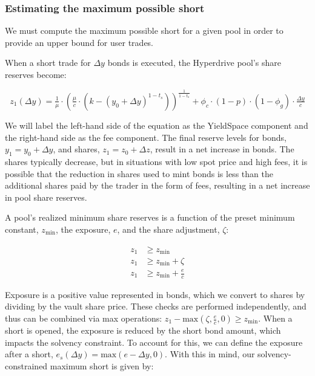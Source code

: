 \subsubsection{Estimating the maximum possible short}

We must compute the maximum possible short for a given pool in order to provide an upper bound for user trades.

When a short trade for $\Delta y$ bonds is executed, the Hyperdrive pool's share reserves become:

\begin{equation}\label{reserve-after-max}
    z_1(\Delta y) = \tfrac{1}{\mu}
    \cdot \left( \tfrac{\mu}{c} \cdot \left( k - (y_0 + \Delta y)^{1 - t_s} \right) \right)^{\tfrac{1}{1 - t_s}}
    + \phi_c \cdot (1 - p) \cdot (1 - \phi_g) \cdot \tfrac{\Delta y}{c}
\end{equation}

We will label the left-hand side of the equation as the YieldSpace component and the right-hand side as the fee component.
The final reserve levels for bonds, $y_1 = y_0 + \Delta y$, and shares, $z_1 = z_0 + \Delta z$, result in a net increase in bonds.
The shares typically decrease, but in situations with low spot price and high fees, it is possible that the reduction in shares used to mint bonds is less than the additional shares paid by the trader in the form of fees, resulting in a net increase in pool share reserves.


A pool's realized minimum share reserves is a function of the preset minimum constant, $z_{\text{min}}$, the exposure, $e$, and the share adjustment, $\zeta$:

\begin{equation}\label{solvency-constraints}
\begin{aligned}
    z_1 &\ge z_{\text{min}} \\
    z_1 &\ge z_{\text{min}} + \zeta \\
    z_1 &\ge z_{\text{min}} + \tfrac{e}{c}
\end{aligned}
\end{equation}

Exposure is a positive value represented in bonds, which we convert to shares by dividing by the vault share price.
These checks are performed independently, and thus can be combined via max operations: $ z_1 - \text{max}\left( \zeta, \tfrac{e}{c}, 0 \right) \ge z_{\text{min}}$.
When a short is opened, the exposure is reduced by the short bond amount, which impacts the solvency constraint.
To account for this, we can define the exposure after a short, $e_s(\Delta y) = \text{max}(e - \Delta y, 0)$.
With this in mind, our solvency-constrained maximum short is given by:

